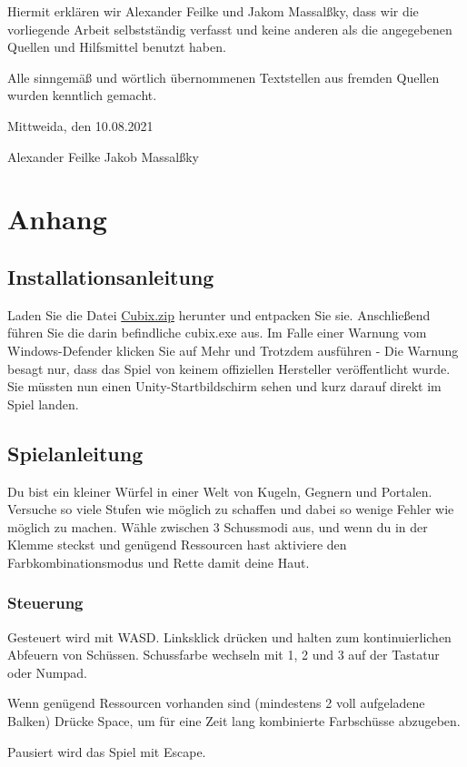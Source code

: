 \documentclass[a4paper,10pt,ngerman,fontsize=12pt]{scrreprt}
\begin{document}
Hiermit erklären wir Alexander Feilke und Jakom Massal{\ss}ky, dass wir die vorliegende Arbeit selbstständig verfasst und keine anderen als die angegebenen Quellen und Hilfsmittel benutzt haben.

Alle sinngemä{\ss} und wörtlich übernommenen Textstellen aus fremden Quellen wurden kenntlich gemacht.

Mittweida, den 10.08.2021

\vspace{2cm}

Alexander Feilke \hspace{4cm} Jakob Massal{\ss}ky





\newpage
\newpage
\chapter{Anhang}




\section{Installationsanleitung}

Laden Sie die Datei \href{https://www.dropbox.com/s/g82vexjznq1x9dd/Cubix.zip?dl=1}{Cubix.zip} herunter und entpacken Sie sie. Anschließend führen Sie die darin befindliche cubix.exe aus.
Im Falle einer Warnung vom Windows-Defender klicken Sie auf Mehr und Trotzdem ausführen - Die Warnung besagt nur, dass das Spiel von keinem offiziellen Hersteller veröffentlicht wurde.
Sie müssten nun einen Unity-Startbildschirm sehen und kurz darauf direkt im Spiel landen.




\section{Spielanleitung}

Du bist ein kleiner Würfel in einer Welt von Kugeln, Gegnern und Portalen. Versuche so viele Stufen wie möglich zu schaffen und dabei so wenige Fehler wie möglich zu machen. Wähle zwischen 3 Schussmodi aus, und wenn du in der Klemme steckst und genügend Ressourcen hast aktiviere den Farbkombinationsmodus und Rette damit deine Haut.



\subsection{Steuerung}

Gesteuert wird mit WASD. Linksklick drücken und halten zum kontinuierlichen Abfeuern von Schüssen. Schussfarbe wechseln mit 1, 2 und 3 auf der Tastatur oder Numpad.

Wenn genügend Ressourcen vorhanden sind (mindestens 2 voll aufgeladene Balken) Drücke Space, um für eine Zeit lang kombinierte Farbschüsse abzugeben.

Pausiert wird das Spiel mit Escape.
\end{document}
